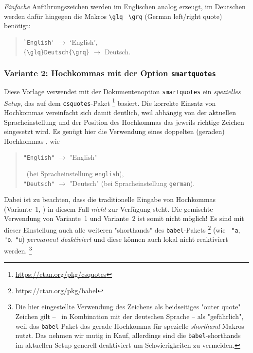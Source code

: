 \emph{Einfache} Anführungszeichen werden im Englischen analog erzeugt, 
im Deutschen werden dafür hingegen die Makros \verb!\glq! \bzw\ \verb!\grq! 
(German left/right quote) benötigt:
%
\begin{quote}
\verb!`English'! $\rightarrow$ `English',\\
\verb!{\glq}Deutsch{\grq}! $\rightarrow$ {\glq}Deutsch{\grq}.
\end{quote}


\subsubsection{Variante 2: Hochkommas mit der Option \texttt{\bfseries smartquotes}}

Diese Vorlage verwendet mit der Dokumentenoption \texttt{smartquotes}
ein \emph{spezielles Setup}, das auf dem \texttt{csquotes}-Paket%
\footnote{\url{https://ctan.org/pkg/csquotes}}
basiert.
Die korrekte Einsatz von Hochkommas vereinfacht sich damit deutlich, weil
abhängig von der aktuellen Spracheinstellung und der Position des Hochkommas
das jeweils richtige Zeichen eingesetzt wird.
Es genügt hier die Verwendung eines doppelten (geraden) Hochkommas \texttt{\textquotedbl}, wie \zB
%
\begin{quote}
\begin{english}\verb!"English"! $\rightarrow$ "English"\end{english}\ (bei Spracheinstellung \texttt{english}),\\
\verb!"Deutsch"! $\rightarrow$ "Deutsch" (bei Spracheinstellung \texttt{german}).
\end{quote}
%
Dabei ist zu beachten, dass die traditionelle Eingabe von Hochkommas (Variante~1, \so) in diesem Fall \emph{nicht}
zur Verfügung steht. Die gemischte Verwendung von Variante~1 und Variante~2 ist somit
nicht möglich! Es sind mit dieser Einstellung auch alle weiteren "shorthands" des 
\texttt{babel}-Pakets%
\footnote{\url{https://ctan.org/pkg/babel}}
(wie \zB\ \verb!"a!, \verb!"o!, \verb!"u!) \emph{permanent deaktiviert} und diese können
auch lokal nicht reaktiviert werden.%
\footnote{Die hier eingestellte Verwendung des \texttt{\textquotedbl} Zeichens als 
beidseitiges "outer quote" Zeichen gilt -- \va\ in Kombination mit der deutschen Sprache --
als "gefährlich", weil das \texttt{babel}-Paket das gerade Hochkomma für spezielle
\emph{shorthand}-Makros nutzt. Das nehmen wir mutig in Kauf, allerdings sind die 
\texttt{babel}-shorthands im aktuellen Setup generell deaktiviert um Schwierigkeiten 
zu vermeiden.}


